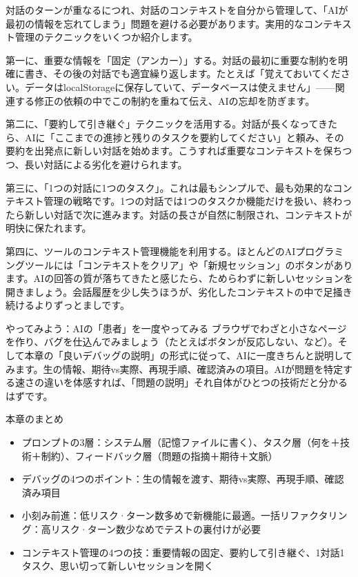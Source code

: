 対話のターンが重なるにつれ、対話のコンテキストを自分から管理して、「AIが最初の情報を忘れてしまう」問題を避ける必要があります。実用的なコンテキスト管理のテクニックをいくつか紹介します。

第一に、重要な情報を「固定（アンカー）」する。対話の最初に重要な制約を明確に書き、その後の対話でも適宜繰り返します。たとえば「覚えておいてください。データはlocalStorageに保存していて、データベースは使えません」——関連する修正の依頼の中でこの制約を重ねて伝え、AIの忘却を防ぎます。

第二に、「要約して引き継ぐ」テクニックを活用する。対話が長くなってきたら、AIに「ここまでの進捗と残りのタスクを要約してください」と頼み、その要約を出発点に新しい対話を始めます。こうすれば重要なコンテキストを保ちつつ、長い対話による劣化を避けられます。

第三に、「1つの対話に1つのタスク」。これは最もシンプルで、最も効果的なコンテキスト管理の戦略です。1つの対話では1つのタスクか機能だけを扱い、終わったら新しい対話で次に進みます。対話の長さが自然に制限され、コンテキストが明快に保たれます。

第四に、ツールのコンテキスト管理機能を利用する。ほとんどのAIプログラミングツールには「コンテキストをクリア」や「新規セッション」のボタンがあります。AIの回答の質が落ちてきたと感じたら、ためらわずに新しいセッションを開きましょう。会話履歴を少し失うほうが、劣化したコンテキストの中で足掻き続けるよりずっとましです。

\begin{tcbpractice}{やってみよう：AIの「患者」を一度やってみる}
ブラウザでわざと小さなページを作り、バグを仕込んでみましょう（たとえばボタンが反応しない、など）。そして本章の「良いデバッグの説明」の形式に従って、AIに一度きちんと説明してみます。生の情報、期待vs実際、再現手順、確認済みの項目。AIが問題を特定する速さの違いを体感すれば、「問題の説明」それ自体がひとつの技術だと分かるはずです。

\end{tcbpractice}

\begin{tcbsummary}{本章のまとめ}
\begin{itemize}
  \item プロンプトの3層：システム層（記憶ファイルに書く）、タスク層（何を＋技術＋制約）、フィードバック層（問題の指摘＋期待＋文脈）
  \item デバッグの4つのポイント：生の情報を渡す、期待vs実際、再現手順、確認済み項目
  \item 小刻み前進：低リスク·ターン数多めで新機能に最適。一括リファクタリング：高リスク·ターン数少なめでテストの裏付けが必要
  \item コンテキスト管理の4つの技：重要情報の固定、要約して引き継ぐ、1対話1タスク、思い切って新しいセッションを開く
\end{itemize}

\end{tcbsummary}
